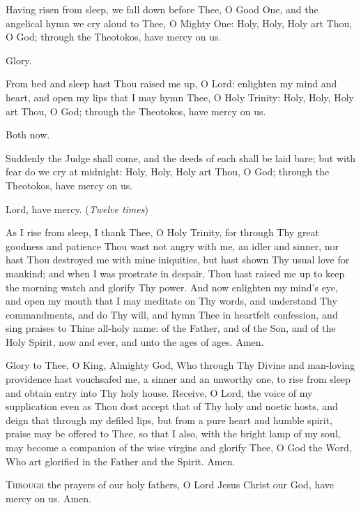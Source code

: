 \documentclass[%
letter]{memoir}
\newcommand\myred[0]{VioletRed4}
\newcommand\twelvetimes[0]{\textcolor{\myred}{(\emph{Twelve times})}}
\newcommand\holyThroughTheotokos[0]{Holy, Holy, Holy art Thou, O God; through the Theotokos, have mercy on us.}
\newcommand\glorycentered[0]{\begin{center} Glory. \end{center}}
\newcommand\bothnowcentered[0]{\begin{center} Both now. \end{center}}
\begin{document}
\begin{tcolorbox}[Baystyle,colback=white]
{\begin{framed}
{\begin{multicols}{2}[]
        Having risen from sleep, we fall down before Thee, O Good One, and the angelical hymn we cry aloud to Thee, O Mighty One: \holyThroughTheotokos

        \glorycentered

        From bed and sleep hast Thou raised me up, O Lord: enlighten my mind and heart, and open my lips that I may hymn Thee, O Holy Trinity: \holyThroughTheotokos

        \bothnowcentered

        Suddenly the Judge shall come, and the deeds of each shall be laid bare; but with fear do we cry at midnight: \holyThroughTheotokos

        Lord, have mercy. \twelvetimes

        \medskip

        As I rise from sleep, I thank Thee, O Holy Trinity, for through Thy great goodness and patience Thou wast not angry with me, an idler and sinner, nor hast Thou destroyed me with mine iniquities, but hast shown Thy usual love for mankind; and when I was prostrate in despair, Thou hast raised me up to keep the morning watch and glorify Thy power. And now enlighten my mind's eye, and open my mouth that I may meditate on Thy words, and understand Thy commandments, and do Thy will, and hymn Thee in heartfelt confession, and sing praises to Thine all-holy name: of the Father, and of the Son, and of the Holy Spirit, now and ever, and unto the ages of ages. Amen.

        \medskip

        Glory to Thee, O King, Almighty God, Who through Thy Divine and man-loving providence hast vouchsafed me, a sinner and an unworthy one, to rise from sleep and obtain entry into Thy holy house. Receive, O Lord, the voice of my supplication even as Thou dost accept that of Thy holy and noetic hosts, and deign that through my defiled lips, but from a pure heart and humble spirit, praise may be offered to Thee, so that I also, with the bright lamp of my soul, may become a companion of the wise virgins and glorify Thee, O God the Word, Who art glorified in the Father and the Spirit. Amen.

        \medskip

        \lettrine{T}{hrough} the prayers of our holy fathers, O Lord Jesus Christ our God, have mercy on us. Amen.

        \end{multicols}
        }
    \end{framed}

}
\end{tcolorbox}
\end{document}
